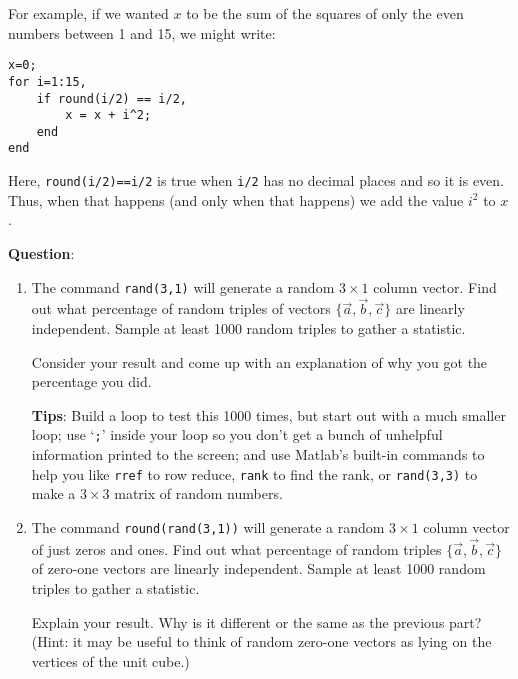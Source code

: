 \documentclass[letter]{article}
\begin{document}
\begin{enumerate}
	For example, if we wanted $x$ to be the sum of the squares of only the even numbers between 1 and 15, we might write:
	\begin{verbatim}
x=0;
for i=1:15,
    if round(i/2) == i/2,
        x = x + i^2;
    end
end
	\end{verbatim}

	Here, {\tt round(i/2)==i/2} is true when {\tt i/2} has no decimal places and so it is even.  Thus, when that happens
	(and only when that happens) we add the value $i^2$ to $x$.


	{\bf Question}:
	\begin{enumerate}
		\item The command \texttt{rand(3,1)} will generate a random $3\times 1$ column vector.  Find out what percentage
		of random triples of vectors $\{\vec a,\vec b,\vec c\}$ are linearly independent.  Sample at least 1000
		random triples to gather a statistic.

		Consider your result and come up with an explanation of why you got the percentage you did.

		{\bf Tips}: Build a loop to test this 1000 times, but start out
		with a much smaller loop;
		use `\texttt{;}' inside your loop so you don't get a bunch of unhelpful information printed to the screen;
		and use Matlab's built-in commands to help you like \texttt{rref} to row reduce, \texttt{rank} to find the
		rank, or \texttt{rand(3,3)} to make a $3\times 3$ matrix of random numbers.

		\item The command \texttt{round(rand(3,1))} will generate a random $3\times 1$ column vector of just zeros
			and ones.  Find out what percentage
			of random triples  $\{\vec a,\vec b,\vec c\}$ of zero-one vectors are linearly independent.  Sample at least 1000
			random triples to gather a statistic.

		Explain your result.  Why is it different or the same as the previous part?  (Hint: it may be useful
		to think of random zero-one vectors as lying on the vertices of the unit cube.)

	\end{enumerate}


	\end{enumerate}
\end{document}

